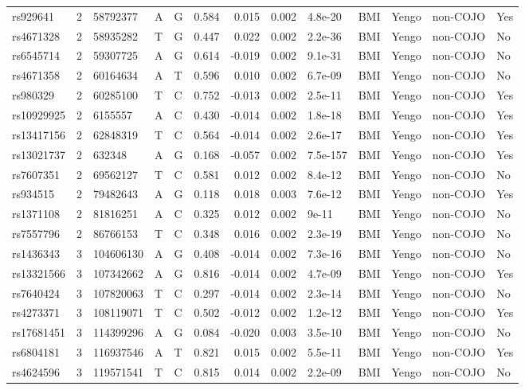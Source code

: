 \documentclass[11pt,twoside]{bristolthesis}
\begin{document}
\begin{longtable}[t]{lrlllrrrlllll}
rs929641 & 2 & 58792377 & A & G & 0.584 & 0.015 & 0.002 & 4.8e-20 & BMI & Yengo & non-COJO & Yes\\
rs4671328 & 2 & 58935282 & T & G & 0.447 & 0.022 & 0.002 & 2.2e-36 & BMI & Yengo & non-COJO & No\\
rs6545714 & 2 & 59307725 & A & G & 0.614 & -0.019 & 0.002 & 9.1e-31 & BMI & Yengo & non-COJO & No\\
\addlinespace
rs4671358 & 2 & 60164634 & A & T & 0.596 & 0.010 & 0.002 & 6.7e-09 & BMI & Yengo & non-COJO & No\\
rs980329 & 2 & 60285100 & T & C & 0.752 & -0.013 & 0.002 & 2.5e-11 & BMI & Yengo & non-COJO & Yes\\
rs10929925 & 2 & 6155557 & A & C & 0.430 & -0.014 & 0.002 & 1.8e-18 & BMI & Yengo & non-COJO & Yes\\
rs13417156 & 2 & 62848319 & T & C & 0.564 & -0.014 & 0.002 & 2.6e-17 & BMI & Yengo & non-COJO & Yes\\
rs13021737 & 2 & 632348 & A & G & 0.168 & -0.057 & 0.002 & 7.5e-157 & BMI & Yengo & non-COJO & Yes\\
\addlinespace
rs7607351 & 2 & 69562127 & T & C & 0.581 & 0.012 & 0.002 & 8.4e-12 & BMI & Yengo & non-COJO & No\\
rs934515 & 2 & 79482643 & A & G & 0.118 & 0.018 & 0.003 & 7.6e-12 & BMI & Yengo & non-COJO & Yes\\
rs1371108 & 2 & 81816251 & A & C & 0.325 & 0.012 & 0.002 & 9e-11 & BMI & Yengo & non-COJO & No\\
rs7557796 & 2 & 86766153 & T & C & 0.348 & 0.016 & 0.002 & 2.3e-19 & BMI & Yengo & non-COJO & No\\
rs1436343 & 3 & 104606130 & A & G & 0.408 & -0.014 & 0.002 & 7.3e-16 & BMI & Yengo & non-COJO & No\\
\addlinespace
rs13321566 & 3 & 107342662 & A & G & 0.816 & -0.014 & 0.002 & 4.7e-09 & BMI & Yengo & non-COJO & Yes\\
rs7640424 & 3 & 107820063 & T & C & 0.297 & -0.014 & 0.002 & 2.3e-14 & BMI & Yengo & non-COJO & No\\
rs4273371 & 3 & 108119071 & T & C & 0.502 & -0.012 & 0.002 & 1.2e-12 & BMI & Yengo & non-COJO & Yes\\
rs17681451 & 3 & 114399296 & A & G & 0.084 & -0.020 & 0.003 & 3.5e-10 & BMI & Yengo & non-COJO & No\\
rs6804181 & 3 & 116937546 & A & T & 0.821 & 0.015 & 0.002 & 5.5e-11 & BMI & Yengo & non-COJO & Yes\\
\addlinespace
rs4624596 & 3 & 119571541 & T & C & 0.815 & 0.014 & 0.002 & 2.2e-09 & BMI & Yengo & non-COJO & No\\

\end{longtable}
\end{document}
